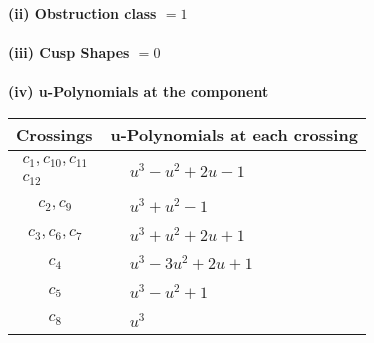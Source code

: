 \documentclass[1p]{elsarticle_modified}
\theoremstyle{definition}
\begin{document}
\flushleft \textbf{(ii) Obstruction class $= 1$}\\~\\
\flushleft \textbf{(iii) Cusp Shapes $= 0$}\\~\\
\newpage\renewcommand{\arraystretch}{1}
\flushleft \textbf{(iv) u-Polynomials at the component}\newline \\
\begin{tabular}{m{50pt}|m{274pt}}
Crossings & \hspace{64pt}u-Polynomials at each crossing \\
\hline $$\begin{aligned}c_{1},c_{10},c_{11}\\c_{12}\end{aligned}$$&$\begin{aligned}
&u^3- u^2+2 u-1
\end{aligned}$\\
\hline $$\begin{aligned}c_{2},c_{9}\end{aligned}$$&$\begin{aligned}
&u^3+u^2-1
\end{aligned}$\\
\hline $$\begin{aligned}c_{3},c_{6},c_{7}\end{aligned}$$&$\begin{aligned}
&u^3+u^2+2 u+1
\end{aligned}$\\
\hline $$\begin{aligned}c_{4}\end{aligned}$$&$\begin{aligned}
&u^3-3 u^2+2 u+1
\end{aligned}$\\
\hline $$\begin{aligned}c_{5}\end{aligned}$$&$\begin{aligned}
&u^3- u^2+1
\end{aligned}$\\
\hline $$\begin{aligned}c_{8}\end{aligned}$$&$\begin{aligned}
&u^3
\end{aligned}$\\
\hline
\end{tabular}\\~\\
\end{document}

